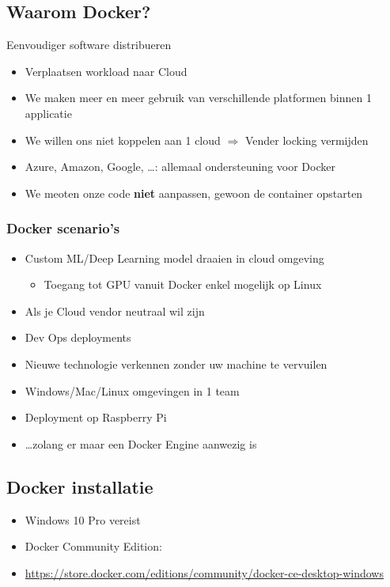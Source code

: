 \documentclass{article}
\newcommand{\bold}[1]{\textbf{#1}}
\begin{document}
\subsection{Waarom Docker?}

Eenvoudiger software distribueren

\begin{itemize}
    \item Verplaatsen workload naar Cloud
    \item We maken meer en meer gebruik van verschillende platformen binnen 1 applicatie
    \item We willen ons niet koppelen aan 1 cloud $\Rightarrow$ Vender locking vermijden
    \item Azure, Amazon, Google, \dots: allemaal ondersteuning voor Docker
    \item We meoten onze code \bold{niet} aanpassen, gewoon de container opstarten
\end{itemize}

\subsubsection{Docker scenario's}

\begin{itemize}
    \item Custom ML/Deep Learning model draaien in cloud omgeving
    \begin{itemize}
        \item Toegang tot GPU vanuit Docker enkel mogelijk op Linux
    \end{itemize}
    \item Als je Cloud vendor neutraal wil zijn
    \item Dev Ops deployments
    \item Nieuwe technologie verkennen zonder uw machine te vervuilen
    \item Windows/Mac/Linux omgevingen in 1 team
    \item Deployment op Raspberry Pi
    \item \dots zolang er maar een Docker Engine aanwezig is
\end{itemize}

\subsection{Docker installatie}

\begin{itemize}
    \item Windows 10 Pro vereist
    \item Docker Community Edition: 
    \item \url{https://store.docker.com/editions/community/docker-ce-desktop-windows}
\end{itemize}
\end{document}
